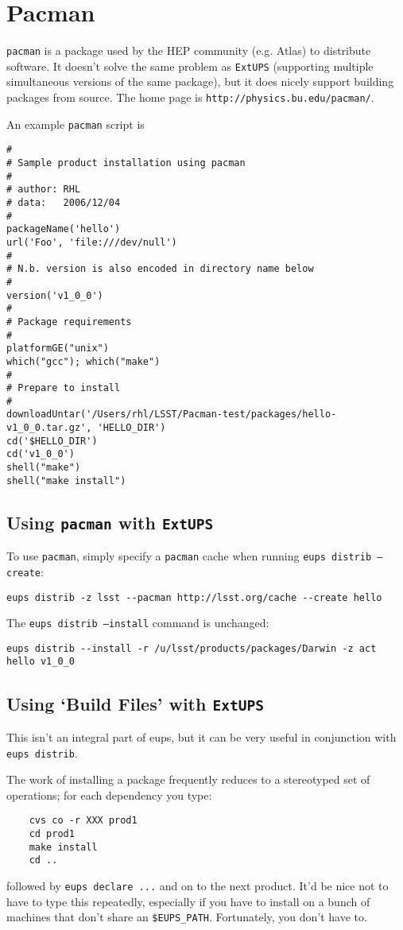 \documentclass{article}
\newcommand{\code}[1]{\texttt{#1}}
\newcommand{\eups}{\code{ExtUPS}}
\newcommand{\pacman}{\code{pacman}}
\begin{document}
\section{Pacman}
\label{pacman}

\pacman{} is a package used by the HEP community (e.g. Atlas) to distribute
software.  It doesn't solve the same problem as \eups{} (supporting 
multiple simultaneous versions of the same package), but it does nicely
support building packages from source.  The home page is \code{http://physics.bu.edu/pacman/}.

An example \pacman{} script is
\begin{verbatim}
#
# Sample product installation using pacman
#
# author: RHL
# data:   2006/12/04
#
packageName('hello')
url('Foo', 'file:///dev/null')
#
# N.b. version is also encoded in directory name below
#
version('v1_0_0')
#
# Package requirements
#
platformGE("unix")
which("gcc"); which("make")
#
# Prepare to install
#
downloadUntar('/Users/rhl/LSST/Pacman-test/packages/hello-v1_0_0.tar.gz', 'HELLO_DIR')
cd('$HELLO_DIR')
cd('v1_0_0')
shell("make")
shell("make install")
\end{verbatim}				%

\subsection{Using \pacman{} with \eups{}}

To use \pacman{}, simply specify a \pacman{} cache when running \code{eups distrib --create}:
\begin{verbatim}
eups distrib -z lsst --pacman http://lsst.org/cache --create hello
\end{verbatim}

The \code{eups distrib --install} command is unchanged:
\begin{verbatim}
eups distrib --install -r /u/lsst/products/packages/Darwin -z act hello v1_0_0
\end{verbatim}

\subsection{Using `Build Files' with \eups{}}
\label{buildFiles}

This isn't an integral part of eups, but it can be very useful in conjunction with \code{eups distrib}.

The work of installing a package frequently reduces to a stereotyped set of operations;
for each dependency you type:
\begin{verbatim}
    cvs co -r XXX prod1
    cd prod1
    make install
    cd ..
\end{verbatim}
followed by \code{eups declare ...} and on to the next product.  It'd
be nice not to have to type this repeatedly, especially if you have to
install on a bunch of machines that don't share an
\code{\$EUPS\_PATH}.  Fortunately, you don't have to.
\end{document}
